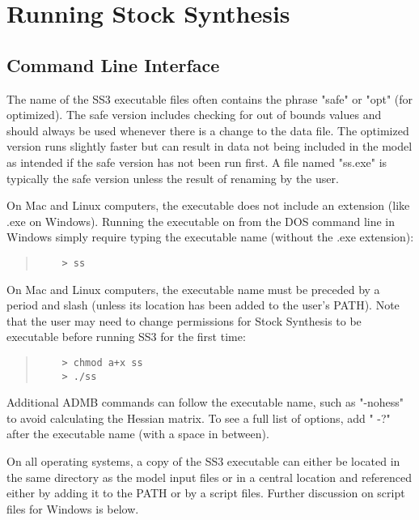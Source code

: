 \section{Running Stock Synthesis} \label{sec:RunningSS}

\subsection{Command Line Interface}
The name of the SS3 executable files often contains the phrase "safe" or "opt" (for optimized). The safe version includes checking for out of bounds values and should always be used whenever there is a change to the data file. The optimized version runs slightly faster but can result in data not being included in the model as intended if the safe version has not been run first. A file named "ss.exe" is typically the safe version unless the result of renaming by the user.

On Mac and Linux computers, the executable does not include an extension (like .exe on Windows).
Running the executable on from the DOS command line in Windows simply require typing the executable name (without the .exe extension):
\begin{quote}
	\begin{verbatim}
	> ss
	\end{verbatim}
\end{quote}


On Mac and Linux computers, the executable name must be preceded by a period and slash (unless its location has been added to the user's PATH). Note that the user may need to change permissions for Stock Synthesis to be executable before running SS3 for the first time:

\begin{quote}
	\begin{verbatim}
	> chmod a+x ss
	> ./ss
	\end{verbatim}
\end{quote}

Additional ADMB commands can follow the executable name, such as "-nohess" to avoid calculating the Hessian matrix. To see a full list of options, add " -?" after the executable name (with a space in between).

On all operating systems, a copy of the SS3 executable can either be located in the same directory as the model input files or in a central location and referenced either by adding it to the PATH or by a script files. Further discussion on script files for Windows is below.

